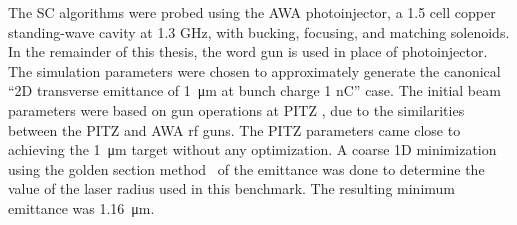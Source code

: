 The SC algorithms were probed using the AWA photoinjector, 
a 1.5 cell copper standing-wave cavity at 1.3 GHz, 
with bucking, focusing, and matching solenoids. 
In the remainder of this thesis, the word gun is used 
in place of photoinjector. The simulation parameters were chosen to 
approximately generate the canonical “2D transverse emittance of \SI{1}{\micro\metre} at bunch charge 1 nC” case.  
The initial beam parameters were based on gun operations at PITZ \cite{pitz},
due to the similarities between the PITZ and AWA rf guns.
The PITZ parameters came close to achieving the \SI{1}{\micro\metre}
target without any optimization. A coarse 1D minimization
using the golden section method~\cite{golden} of the 
emittance was done to determine the value of the laser radius 
used in this benchmark. The resulting minimum emittance was   
\SI{1.16}{\micro\metre}. 

